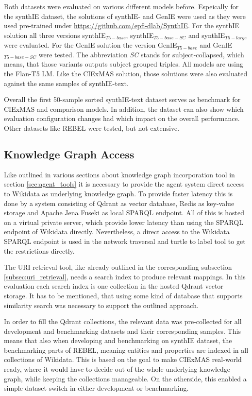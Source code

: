 \documentclass[a4paper,oneside,bibliography=totoc]{scrbook}
\begin{document}
Both datasets were evaluated on various different models before. Espeically for the synthIE dataset, the solutions of \citet{Josifoski2023} synthIE- and GenIE were used as they were used pre-trained under \url{https://github.com/epfl-dlab/SynthIE}. For the synthIE solution all three versions synthIE$_{T5-base}$, synthIE$_{T5-base-SC}$ and synthIE$_{T5-large}$ were evaluated. For the GenIE solution the version GenIE$_{T5-base}$ and GenIE$_{T5-base-SC}$ were tested. The abbreviation \textit{SC} stands for subject-collapsed, which means, that those variants outputs subject grouped triples. All models are using the Flan-T5 \ac{LM}. Like the CIExMAS solution, those solutions were also evaluated against the same samples of synthIE-text.

Overall the first 50-sample sorted synthIE-text dataset serves as benchmark for CIExMAS and comparison models. In addition, the dataset can also show which evaluation configuration changes had which impact on the overall performance. Other datasets like REBEL were tested, but not extensive.

\subsection{Knowledge Graph Access}

Like outlined in various sections about knowledge graph incorporation tool in section \ref{sec:agent_tools} it is necessary to provide the agent system direct access to Wikidata as underlying knowledge graph. To provide faster latency this is done by a system consisting of Qdrant as vector database, Redis as key-value storage and Apache Jena Fuseki as local SPARQL endpoint. All of this is hosted on a virtual private server, which provide lower latency than using the SPARQL endpoint of Wikidata directly. Nevertheless, a direct access to the Wikidata SPARQL endpoint is used in the network traversal and turtle to label tool to get the restrictions directly.

The URI retrieval tool, like already outlined in the corresponding subsection \ref{subsec:uri_retrieval}, needs a search index to produce relevant mappings. In this evaluation each search index is one collection in the hosted Qdrant vector storage. It has to be mentioned, that using some kind of database that supports similarity search was necessary to support the outlined approach.

In order to fill the Qdrant collections, the relevant data was pre-collected for all development and benchmarking datasets and their corresponding samples. This means that also when developing and benchmarking on synthIE dataset, the benchmarking parts of REBEL, meaning entities and properties are indexed in all collections of Wikidata. This is based on the goal to make CIExMAS real-world ready, where it would have to decide out of the whole underlying knowledge graph, while keeping the collections manageable. On the otherside, this enabled a simple dataset switch in either development or benchmarking.
\end{document}
